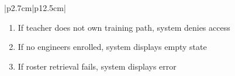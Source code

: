 \begin{table}[H]
\begin{tabular}{|p{2.7cm}|p{12.5cm}|}
\begin{minipage}[t]{\linewidth}
                                      \begin{enumerate}[topsep=0pt,itemsep=1pt,parsep=0pt,partopsep=0pt]
                                          \item If teacher does not own training path, system denies access
                                          \item If no engineers enrolled, system displays empty state
                                          \item If roster retrieval fails, system displays error
                                      \end{enumerate}
                                  \end{minipage} \\
        \hline
    \end{tabular}
    \label{tab:teacher-engineer-roster}
\end{table}
